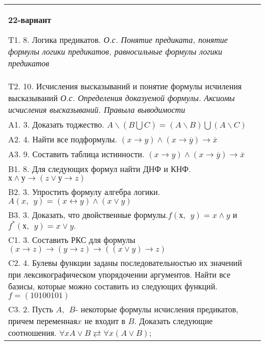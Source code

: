 \documentclass{article}
\begin{document}
\begin{tabular}{m{17cm}}
\textbf{22-вариант}
\newline

T1. 8. Логика предикатов. \emph{О.с. Понятие предиката, понятие формулы логики предикатов, равносильные формулы логики предикатов} \\
T2. 10. Исчисления высказываний и понятие формулы исчиления высказываний \emph{О.с. Определения доказуемой формулы. Аксиомы исчисления высказываний. Правыла выводимости} \\
A1. 3. Доказать тоджество. \(A\backslash(B\bigcup C) = (A\backslash B)\bigcup(A\backslash C)\) \\
A2. 4. Найти все подформулы. \((x \rightarrow y) \land (x \rightarrow \overline{y}) \rightarrow \overline{x}\) \\
A3. 9. Составить таблица истинности. \((x \rightarrow y) \land (x \rightarrow \overline{y}) \rightarrow \overline{x}\) \\
B1. 8. Для следующих формул найти ДНФ и КНФ. \(х \land у \rightarrow (z \vee у \rightarrow z)\) \\
B2. 3. Упростить формулу алгебра логики. \(A(x,\ \ y) = (x \leftrightarrow y) \land (x \vee y)\) \\
B3. 3. Доказать, что двойственные формулы.\(f(х,\ \ y) = x \land y\) и \(f^{*}(х,\ \ y) = x \vee y.\) \\
C1. 3. Составить РКС для формулы \((x \rightarrow z) \rightarrow (y \rightarrow z) \rightarrow ((x \vee y) \rightarrow z)\) \\
C2. 4. Булевы функции заданы последовательностью их значений при лексикографическом упорядочении аргументов. Найти все базисы, которые можно составить из следующих функций. \(f = (10100101)\) \\
C3. 2. Пусть \(A,\ \ B\)- некоторые формулы исчисления предикатов, причем переменная\(x\) не входит в \(B\). Доказать следующие соотношения. \(\forall xA \vee B \rightleftarrows \forall x(A \vee B)\); \\

\end{tabular}
\vspace{1cm}
\end{document}
